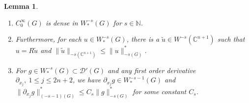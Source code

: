 \documentclass[a4paper,centertags,oneside,12pt]{amsart}
\newtheorem{lemma}[theorem]{Lemma}
\numberwithin{equation}{section}
\begin{document}
\begin{lemma}\label{lem2.1}

\begin{enumerate}
    \item $C_0^\infty(G)$ is dense in $W_\ast^{-s}(G)$ for $s\in\mathbb N$.
    \item Furthermore, for each $u\in W_\ast^{-s}(G)$, there is a $\tilde u\in W^{-s}(\mathbb C^{n+1})$ such that $u=R\tilde u$ and $\|\tilde u\|_{-s(\mathbb C^{n+1})}\leq \|u\|_{-s(G)}^\ast$.
    \item For $g\in W^{-s}_\ast(G)\subset {\mathcal D}'(G)$ and any first order derivative $\partial_{x_j}, ~1\leq j\leq 2n+2$, we have $\partial_{x_j}g\in W^{-s-1}_\ast(G)$ and $\|\partial_{x_j} g\|^\ast_{(-s-1)(G)}\leq C_s \|g\|_{-s(G)}^\ast$ for some constant $C_s$.
\end{enumerate}
\end{lemma}
\end{document}
